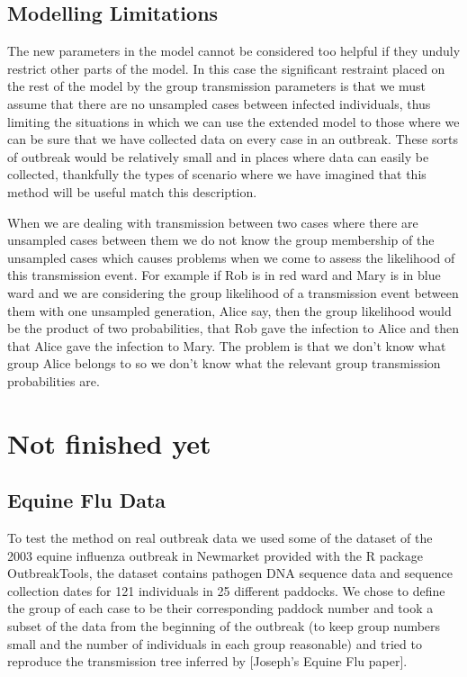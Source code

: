 \documentclass[11pt,a4paper]{report}
\begin{document}
\section{Modelling Limitations}
The new parameters in the model cannot be considered too helpful if they unduly restrict other parts of the model. In this case the significant restraint placed on the rest of the model by the group transmission parameters is that we must assume that there are no unsampled cases between infected individuals, thus limiting the situations in which we can use the extended model to those where we can be sure that we have collected data on every case in an outbreak. These sorts of outbreak would be relatively small and in places where data can easily be collected, thankfully the types of scenario where we have imagined that this method will be useful match this description.

When we are dealing with transmission between two cases where there are unsampled cases between them we do not know the group membership of the unsampled cases which causes problems when we come to assess the likelihood of this transmission event. For example if Rob is in red ward and Mary is in blue ward and we are considering the group likelihood of a transmission event between them with one unsampled generation, Alice say, then the group likelihood would be the product of two probabilities, that Rob gave the infection to Alice and then that Alice gave the infection to Mary. The problem is that we don't know what group Alice belongs to so we don't know what the relevant group transmission probabilities are.


\chapter{Not finished yet}


\section{Equine Flu Data}
To test the method on real outbreak data we used some of the dataset of the 2003 equine influenza outbreak in Newmarket provided with the R package OutbreakTools, the dataset contains pathogen DNA sequence data and sequence collection dates for 121 individuals in 25 different paddocks. We chose to define the group of each case to be their corresponding paddock number and took a subset of the data from the beginning of the outbreak (to keep group numbers small and the number of individuals in each group reasonable) and tried to reproduce the transmission tree inferred by [Joseph’s Equine Flu paper].
\end{document}
